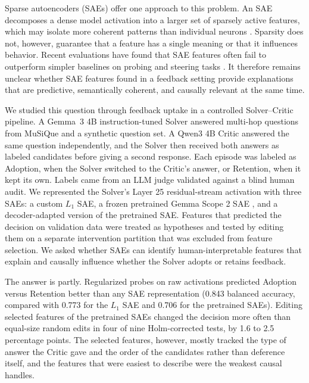 \documentclass[pdflatex,sn-mathphys-num]{sn-jnl}
\theoremstyle{thmstylethree}%
\begin{document}
Sparse autoencoders (SAEs) offer one approach to this problem. An SAE decomposes a dense model activation into a larger set of sparsely active features,
which may isolate more coherent patterns than individual neurons \cite{cunningham2023sparse,gao2025scaling}. Sparsity does not, however, guarantee that a
feature has a single meaning or that it influences behavior. Recent evaluations have found that SAE features often fail to outperform simpler baselines on
probing and steering tasks \cite{kantamneni2025useful,wu2025axbench}. It therefore remains unclear whether SAE features found in a feedback setting provide
explanations that are predictive, semantically coherent, and causally relevant at the same time.

We studied this question through feedback uptake in a controlled Solver--Critic pipeline. A Gemma~3 4B instruction-tuned Solver \cite{gemmateam2025gemma3}
answered multi-hop questions from MuSiQue \cite{trivedi2022musique} and a synthetic question set. A Qwen3 4B Critic \cite{yang2025qwen3} answered the same
question independently, and the Solver then received both answers as labeled candidates before giving a second response. Each episode was labeled as
Adoption, when the Solver switched to the Critic's answer, or Retention, when it kept its own. Labels came from an LLM judge validated against a blind human
audit. We represented the Solver's Layer 25 residual-stream activation with three SAEs: a custom $L_1$ SAE, a frozen pretrained Gemma Scope 2 SAE
\cite{mcdougall2025gemmascope2}, and a decoder-adapted version of the pretrained SAE. Features that predicted the decision on validation data were treated
as hypotheses and tested by editing them on a separate intervention partition that was excluded from feature selection. We asked whether SAEs can identify
human-interpretable features that explain and causally influence whether the Solver adopts or retains feedback.

The answer is partly. Regularized probes on raw activations predicted Adoption versus Retention better than any SAE representation (0.843 balanced accuracy,
compared with 0.773 for the $L_1$ SAE and 0.706 for the pretrained SAEs). Editing selected features of the pretrained SAEs changed the decision more often
than equal-size random edits in four of nine Holm-corrected tests, by 1.6 to 2.5 percentage points. The selected features, however, mostly tracked the type
of answer the Critic gave and the order of the candidates rather than deference itself, and the features that were easiest to describe were the weakest
causal handles.
\end{document}
